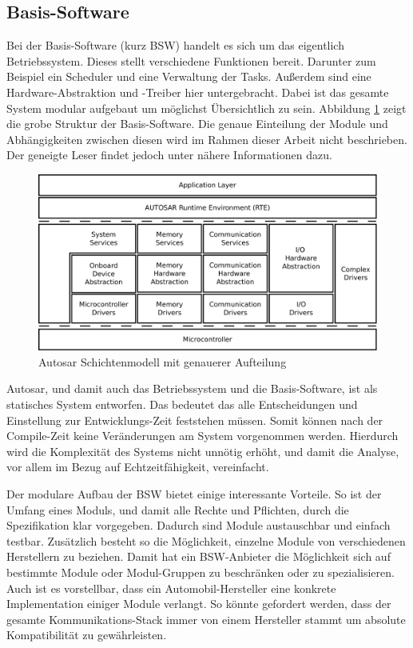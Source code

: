 \documentclass[
  a4paper,					    %
  twoside,
  DIV=calc,     				%
  bibliography=totoc,
  cleardoublepage=empty,
  ngerman,     					%
  final       					%
]{scrbook}
\begin{document}
\subsection{Basis-Software}
\label{sec:bsw}
Bei der Basis-Software (kurz BSW) handelt es sich um das eigentlich Betriebssystem. Dieses stellt verschiedene Funktionen bereit. Darunter zum Beispiel ein Scheduler und eine Verwaltung der Tasks. Außerdem sind eine Hardware-Abstraktion und -Treiber hier untergebracht. Dabei ist das gesamte System modular aufgebaut um möglichst Übersichtlich zu sein. Abbildung \ref{fig:autosar_refined_layer} zeigt die grobe Struktur der Basis-Software. Die genaue Einteilung der Module und Abhängigkeiten zwischen diesen wird im Rahmen dieser Arbeit nicht beschrieben. Der geneigte Leser findet jedoch unter \cite{autosar_layer} nähere Informationen dazu.

\begin{figure}[!htbp]
    \centering
    \includegraphics[width=1\textwidth]{autosar_refined_layer}
    \caption{Autosar Schichtenmodell mit genauerer Aufteilung}
    \label{fig:autosar_refined_layer}
\end{figure}

Autosar, und damit auch das Betriebssystem und die Basis-Software, ist als statisches System entworfen. Das bedeutet das alle Entscheidungen und Einstellung zur Entwicklungs-Zeit feststehen müssen. Somit können nach der Compile-Zeit keine Veränderungen am System vorgenommen werden. Hierdurch wird die Komplexität des Systems nicht unnötig erhöht, und damit die Analyse, vor allem im Bezug auf Echtzeitfähigkeit, vereinfacht.

Der modulare Aufbau der BSW bietet einige interessante Vorteile. So ist der Umfang eines Moduls, und damit alle Rechte und Pflichten, durch die Spezifikation klar vorgegeben. Dadurch sind Module austauschbar und einfach testbar. Zusätzlich besteht so die Möglichkeit, einzelne Module von verschiedenen Herstellern zu beziehen. Damit hat ein BSW-Anbieter die Möglichkeit sich auf bestimmte Module oder Modul-Gruppen zu beschränken oder zu spezialisieren. Auch ist es vorstellbar, dass ein Automobil-Hersteller eine konkrete Implementation einiger Module verlangt. So könnte gefordert werden, dass der gesamte Kommunikations-Stack immer von einem Hersteller stammt um absolute Kompatibilität zu gewährleisten.
\end{document}
